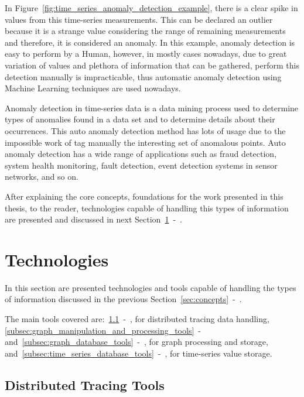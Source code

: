 In Figure~\ref{fig:time_series_anomaly_detection_example}, there is a clear spike in values from this time-series measurements. This can be declared an outlier because it is a strange value considering the range of remaining measurements and therefore, it is considered an anomaly. In this example, anomaly detection is easy to perform by a Human, however, in mostly cases nowadays, due to great variation of values and plethora of information that can be gathered, perform this detection manually is impracticable, thus automatic anomaly detection using Machine Learning techniques are used nowadays.

Anomaly detection in time-series data is a data mining process used to determine types of anomalies found in a data set and to determine details about their occurrences. This auto anomaly detection method has lots of usage due to the impossible work of tag manually the interesting set of anomalous points. Auto anomaly detection has a wide range of applications such as fraud detection, system health monitoring, fault detection, event detection systems in sensor networks, and so on.

After explaining the core concepts, foundations for the work presented in this thesis, to the reader, technologies capable of handling this types of information are presented and discussed in next Section~\ref{sec:technologies}~-~.

\section{Technologies}
\label{sec:technologies}

In this section are presented technologies and tools capable of handling the types of information discussed in the previous Section~\ref{sec:concepts}~-~.

The main tools covered are:~\ref{subsec:distributed_tracing_tools}~-~, for distributed tracing data handling, \ref{subsec:graph_manipulation_and_processing_tools}~-~ and~\ref{subsec:graph_database_tools}~-~, for graph processing and storage, and~\ref{subsec:time_series_database_tools}~-~, for time-series value storage.

\subsection{Distributed Tracing Tools}
\label{subsec:distributed_tracing_tools}

